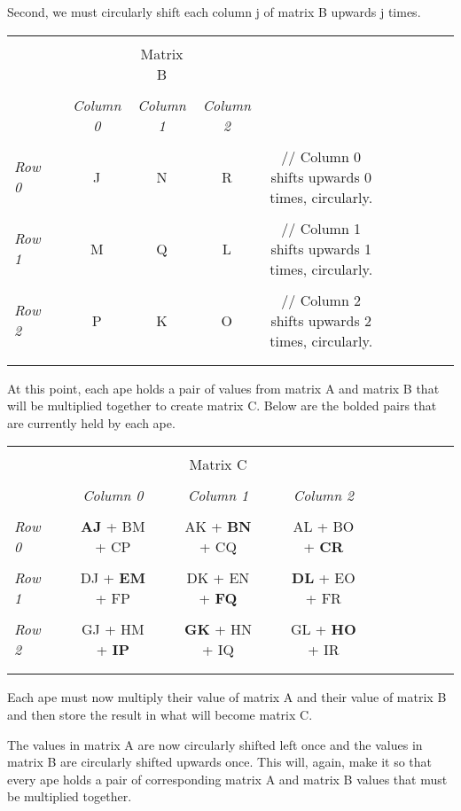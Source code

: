 \documentclass[10pt]{article}
\begin{document}
Second, we must circularly shift each column j of matrix B upwards j times. \par

\begin{tabular}{l*{9}{c}r}
  \\
  \\
  & & & Matrix B \\
  \\
  & &
  \textit{Column 0} &
  \textit{Column 1} &
  \textit{Column 2} & \\
  \\
  \textit{Row 0} & & J & N & R & // Column 0 shifts upwards 0 times, circularly.\\
  \\
  \textit{Row 1} & & M & Q & L & // Column 1 shifts upwards 1 times, circularly.\\
  \\
  \textit{Row 2} & & P & K & O & // Column 2 shifts upwards 2 times, circularly.\\
  \\
  \\
\end{tabular}

At this point, each ape holds a pair of values from matrix A and matrix B that will be multiplied together to create matrix C.  Below are the bolded pairs that are currently held by each ape. \par

\begin{tabular}{l*{11}{c}r}
  \\
  \\
  && && Matrix C \\
  \\
  & &
  \textit{Column 0} &&
  \textit{Column 1} &&
  \textit{Column 2} \\
  \\
  \textit{Row 0} && \textbf{AJ} + BM + CP && AK + \textbf{BN} + CQ && AL + BO + \textbf{CR} \\
  \\
  \textit{Row 1} && DJ + \textbf{EM} + FP && DK + EN + \textbf{FQ} && \textbf{DL} + EO + FR \\
  \\
  \textit{Row 2} && GJ + HM + \textbf{IP} && \textbf{GK} + HN + IQ && GL + \textbf{HO} + IR \\
  \\
  \\
\end{tabular}

Each ape must now multiply their value of matrix A and their value of matrix B and then store the result in what will become matrix C. \par
    The values in matrix A are now circularly shifted left once and the values in matrix B are circularly shifted upwards once.  This will, again, make it so that every ape holds a pair of corresponding matrix A and matrix B values that must be multiplied together. \par
\end{document}
